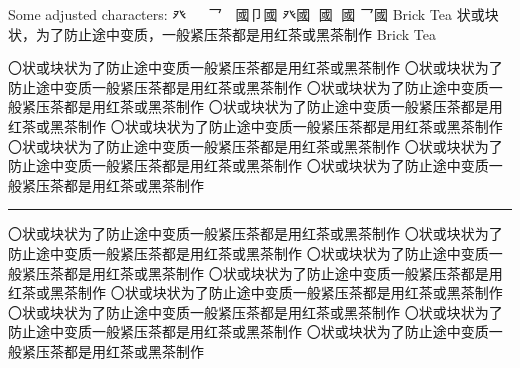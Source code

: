 
\begin{multicols}{3}
Some adjusted characters:
{
{\cnxBabel{}癶}
{\cnxJzr{}}
{\cnxJzr{}}
{\cn{}乛}
{\cnxJzr{}}
{\cn{}國}{\cn{}卩}{\cn{}國}
{\cnxBabel{}癶}{\cn{}國}
{\cnxJzr{}}{\cn{}國}
{\cnxJzr{}}{\cn{}國}
{\cn{}乛}{\cn{}國}} Brick Tea {
{\cn{}状或块状，为了防止途中变质，一般紧压茶都是用红茶或黑茶制作}} Brick Tea


\end{multicols}
\begin{multicols}{3}

{\cjk 〇状或块状为了防止途中变质一般紧压茶都是用红茶或黑茶制作
〇状或块状为了防止途中变质一般紧压茶都是用红茶或黑茶制作
〇状或块状为了防止途中变质一般紧压茶都是用红茶或黑茶制作
〇状或块状为了防止途中变质一般紧压茶都是用红茶或黑茶制作
〇状或块状为了防止途中变质一般紧压茶都是用红茶或黑茶制作
〇状或块状为了防止途中变质一般紧压茶都是用红茶或黑茶制作
〇状或块状为了防止途中变质一般紧压茶都是用红茶或黑茶制作
〇状或块状为了防止途中变质一般紧压茶都是用红茶或黑茶制作
}

\end{multicols}
\hrule\par
\begin{multicols}{3}

{\cjk 〇状或块状为了防止途中变质一般紧压茶都是用红茶或黑茶制作
〇状或块状为了防止途中变质一}{\cjk 般紧压茶}{\cjk 都是用红茶或黑茶制作
〇状或块状}{\cjk 为了防止途中变质一般紧压茶都是用红茶或黑茶制作
〇状或块状为了防止途中变质一般紧压茶都是用红茶或黑茶制作
}{\cjk 〇状或块状为了防止途中变质一般紧压茶都是用红茶或黑茶制作
〇状或块状为了防止途中变质一般紧压茶都是用红}{\cjk 茶或黑茶制作
〇状或块状为了防止途中变质一般紧压茶都是用红茶或黑茶制作
〇状或块状为了防止途中变质一般紧压茶都是用红茶或黑茶制作
}


\end{multicols}

